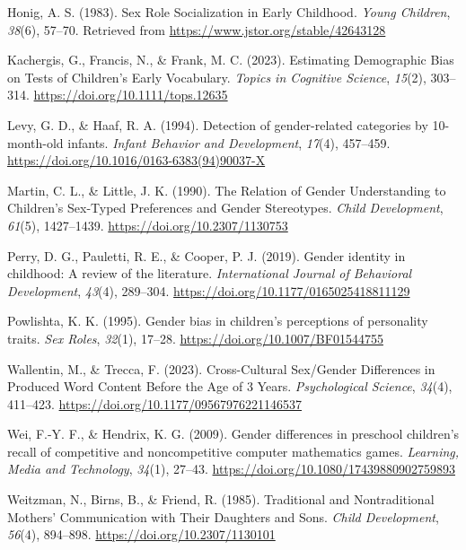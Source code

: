 \documentclass[
  man]{apa6}
\newlength{\cslhangindent}
\newlength{\cslentryspacingunit} %
\newenvironment{CSLReferences}[2] %
 {%
  \setlength{\parindent}{0pt}
  \ifodd #1
  \let\oldpar\par
  \def\par{\hangindent=\cslhangindent\oldpar}
  \fi
  \setlength{\parskip}{#2\cslentryspacingunit}
 }%
 {}
\begin{document}
\begin{CSLReferences}{1}{0}
\leavevmode{}%
Honig, A. S. (1983). Sex {Role Socialization} in {Early Childhood}. \emph{Young Children}, \emph{38}(6), 57--70. Retrieved from \url{https://www.jstor.org/stable/42643128}

\leavevmode{}%
Kachergis, G., Francis, N., \& Frank, M. C. (2023). Estimating {Demographic Bias} on {Tests} of {Children}'s {Early Vocabulary}. \emph{Topics in Cognitive Science}, \emph{15}(2), 303--314. \url{https://doi.org/10.1111/tops.12635}

\leavevmode{}%
Levy, G. D., \& Haaf, R. A. (1994). Detection of gender-related categories by 10-month-old infants. \emph{Infant Behavior and Development}, \emph{17}(4), 457--459. \url{https://doi.org/10.1016/0163-6383(94)90037-X}

\leavevmode{}%
Martin, C. L., \& Little, J. K. (1990). The {Relation} of {Gender Understanding} to {Children}'s {Sex-Typed Preferences} and {Gender Stereotypes}. \emph{Child Development}, \emph{61}(5), 1427--1439. \url{https://doi.org/10.2307/1130753}

\leavevmode{}%
Perry, D. G., Pauletti, R. E., \& Cooper, P. J. (2019). Gender identity in childhood: {A} review of the literature. \emph{International Journal of Behavioral Development}, \emph{43}(4), 289--304. \url{https://doi.org/10.1177/0165025418811129}

\leavevmode{}%
Powlishta, K. K. (1995). Gender bias in children's perceptions of personality traits. \emph{Sex Roles}, \emph{32}(1), 17--28. \url{https://doi.org/10.1007/BF01544755}

\leavevmode{}%
Wallentin, M., \& Trecca, F. (2023). Cross-{Cultural Sex}/{Gender Differences} in {Produced Word Content Before} the {Age} of 3 {Years}. \emph{Psychological Science}, \emph{34}(4), 411--423. \url{https://doi.org/10.1177/09567976221146537}

\leavevmode{}%
Wei, F.-Y. F., \& Hendrix, K. G. (2009). Gender differences in preschool children's recall of competitive and noncompetitive computer mathematics games. \emph{Learning, Media and Technology}, \emph{34}(1), 27--43. \url{https://doi.org/10.1080/17439880902759893}

\leavevmode{}%
Weitzman, N., Birns, B., \& Friend, R. (1985). Traditional and {Nontraditional Mothers}' {Communication} with {Their Daughters} and {Sons}. \emph{Child Development}, \emph{56}(4), 894--898. \url{https://doi.org/10.2307/1130101}

\end{CSLReferences}

\endgroup
\end{document}
